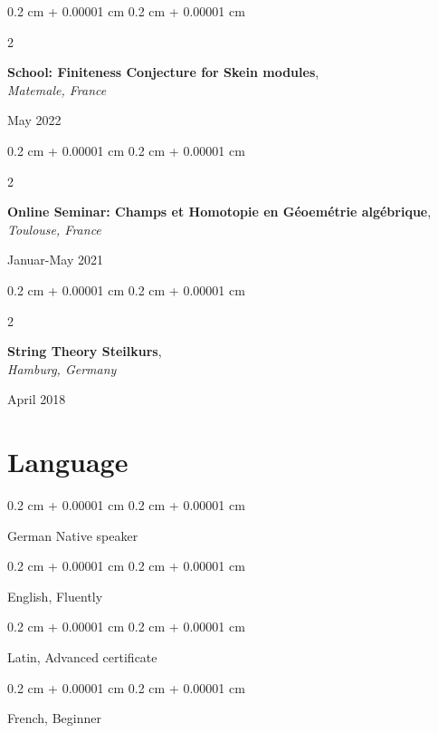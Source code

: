\documentclass[10pt, letterpaper]{article}
\newenvironment{onecolentry}{
    \begin{adjustwidth}{
        0.2 cm + 0.00001 cm
    }{
        0.2 cm + 0.00001 cm
    }
}{
    \end{adjustwidth}
} %
\newenvironment{twocolentry}[2][]{
    \onecolentry
    \def\secondColumn{#2}
    \setcolumnwidth{\fill, 4.5 cm}
    \begin{paracol}{2}
}{
    \switchcolumn \raggedleft \secondColumn
    \end{paracol}
    \endonecolentry
} %
\begin{document}
 \vspace{0.2cm}

 \begin{twocolentry}{

    May 2022
           
        }
            \textbf{School: Finiteness Conjecture for Skein modules}, \\
            \textit{Matemale, France}
            
           
        \end{twocolentry}
        
 \vspace{0.2cm}

\begin{twocolentry}{

    Januar-May 2021
           
        }
            \textbf{Online Seminar: Champs et Homotopie en G\'{e}oem\'{e}trie alg\'{e}brique}, \\
            \textit{Toulouse, France}
            
           
        \end{twocolentry}
        
 \vspace{0.2cm}

 \begin{twocolentry}{

    April 2018
           
        }
            \textbf{String Theory Steilkurs}, \\
            \textit{Hamburg, Germany}
            
           
        \end{twocolentry}
        
 \vspace{0.2cm}

\section{Language}
        
        \begin{onecolentry}
            German Native speaker
        \end{onecolentry}

        \vspace{0.2 cm}

        \begin{onecolentry}
           English, Fluently
        \end{onecolentry}

        \vspace{0.2 cm}

        \begin{onecolentry}
           Latin, Advanced certificate
        \end{onecolentry}

        \begin{onecolentry}
            French, Beginner
        \end{onecolentry}
        

 
\end{document}
